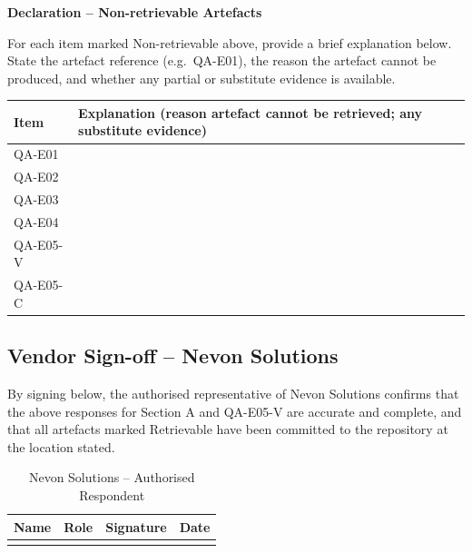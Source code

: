 \documentclass[11pt,a4paper]{article}
\begin{document}
\vspace{0.3cm}

\noindent\colorbox{declarebox}{\begin{minipage}{\dimexpr\textwidth-2\fboxsep\relax}
\textbf{Declaration -- Non-retrievable Artefacts}

\medskip
For each item marked Non-retrievable above, provide a brief explanation below. State the artefact reference (e.g.\ QA-E01), the reason the artefact cannot be produced, and whether any partial or substitute evidence is available.
\end{minipage}}

\vspace{0.3cm}

\renewcommand{\arraystretch}{1.4}
\begin{longtable}{|p{}|p{}|}
\hline
\rowcolor{tableheader}
\textbf{Item} & \textbf{Explanation (reason artefact cannot be retrieved; any substitute evidence)} \\
\hline
\endhead

QA-E01 & \vspace{2.2cm} \tabularnewline
\hline
QA-E02 & \vspace{2.2cm} \tabularnewline
\hline
QA-E03 & \vspace{2.2cm} \tabularnewline
\hline
QA-E04 & \vspace{2.2cm} \tabularnewline
\hline
QA-E05-V & \vspace{2.2cm} \tabularnewline
\hline
QA-E05-C & \vspace{2.2cm} \tabularnewline
\hline
\end{longtable}

\vspace{0.3cm}

\subsection*{Vendor Sign-off -- Nevon Solutions}

\noindent By signing below, the authorised representative of Nevon Solutions confirms that the above responses for Section A and QA-E05-V are accurate and complete, and that all artefacts marked Retrievable have been committed to the repository at the location stated.

\vspace{0.3cm}

\begin{table}[H]
\centering
\small
\renewcommand{\arraystretch}{2.4}
\begin{tabular}{|m{}|m{}|m{}|m{}|}
\hline
\rowcolor{tableheader}
\textbf{Name} & \textbf{Role} & \textbf{Signature} & \textbf{Date} \\
\hline
& & & \\
\hline
\end{tabular}
\caption*{Nevon Solutions -- Authorised Respondent}
\end{table}
\end{document}
